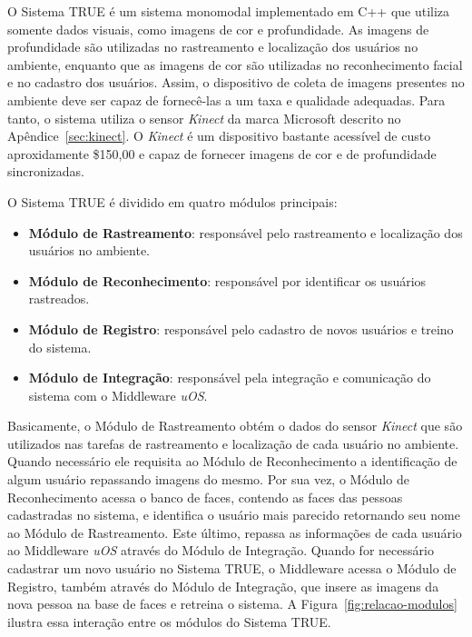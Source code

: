 

O Sistema TRUE é um sistema monomodal implementado em C++ que utiliza somente dados visuais, como imagens de cor e profundidade. As imagens de profundidade são utilizadas no rastreamento e localização dos usuários no ambiente, enquanto que as imagens de cor são utilizadas no reconhecimento facial e no cadastro dos usuários. Assim, o dispositivo de coleta de imagens presentes no ambiente deve ser capaz de fornecê-las a um taxa e qualidade adequadas. Para tanto, o sistema utiliza o sensor \textit{Kinect} da marca Microsoft descrito no Apêndice~\ref{sec:kinect}. O \textit{Kinect} é um dispositivo bastante acessível de custo aproxidamente \$150,00 e capaz de fornecer imagens de cor e de profundidade sincronizadas.

O Sistema TRUE é dividido em quatro módulos principais:

	\begin{itemize}
		\item \textbf{Módulo de Rastreamento}: responsável pelo rastreamento e localização dos usuários no ambiente.
		\item \textbf{Módulo de Reconhecimento}: responsável por identificar os usuários rastreados.
		\item \textbf{Módulo de Registro}: responsável pelo cadastro de novos usuários e treino do sistema.
		\item \textbf{Módulo de Integração}: responsável pela integração e comunicação do sistema com o Middleware \textit{uOS}.
	\end{itemize}

Basicamente, o Módulo de Rastreamento obtém o dados do sensor \textit{Kinect} que são utilizados nas tarefas de rastreamento e localização de cada usuário no ambiente. Quando necessário ele requisita ao Módulo de Reconhecimento a identificação de algum usuário repassando imagens do mesmo. Por sua vez, o Módulo de Reconhecimento acessa o banco de faces, contendo as faces das pessoas cadastradas no sistema, e identifica o usuário mais parecido retornando seu nome ao Módulo de Rastreamento. Este último, repassa as informações de cada usuário ao Middleware \textit{uOS} através do Módulo de Integração. Quando for necessário cadastrar um novo usuário no Sistema TRUE, o Middleware acessa o Módulo de Registro, também através do Módulo de Integração, que insere as imagens da nova pessoa na base de faces e retreina o sistema. A Figura~\ref{fig:relacao-modulos} ilustra essa interação entre os módulos do Sistema TRUE.

